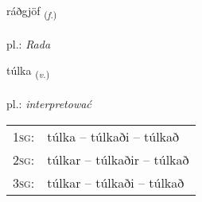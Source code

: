 \documentclass[frontgrid, backgrid]{flacards}\usepackage[]{graphicx}\usepackage[]{xcolor}
\begin{document}
\renewcommand{\blhead}{\vskip5pt {\small\bfseries\footnotesize Nafnorð | Noun }}
\renewcommand{\bcfoot}{\vskip5pt \hspace{2pt}{\small\bfseries\footnotesize 2K}}


{ráðgjöf \small{\textsubscript{(\textit{f.})}} \\[1ex] %
\textphonetic{[rauðcœv]} \\
pl.: \emph{Rada} \\  [2ex]
\renewcommand*{\arraystretch}{0.8}
}

\renewcommand{\flhead}{\vskip5pt \fboxsep=0pt {\small\bfseries\footnotesize Sagnorð | Verb}}
\renewcommand{\fcfoot}{\vskip5pt \fboxsep=0pt \hspace{2pt}{\small\bfseries\footnotesize 2K}}

\renewcommand{\blhead}{\vskip5pt {\small\bfseries\footnotesize Sagnorð | Verb }}
\renewcommand{\bcfoot}{\vskip5pt \hspace{2pt}{\small\bfseries\footnotesize 2K}}


{túlka \small{\textsubscript{(\textit{v.})}} \\[1ex] %
\textphonetic{[tʰul̥ka]} \\
pl.: \emph{interpretować} \\  [2ex]
\renewcommand*{\arraystretch}{0.8}
\begin{tabular}{p{1cm}l}
\textsc{1sg}: & túlka -- túlkaði -- túlkað \\ 
\textsc{2sg}: & túlkar -- túlkaðir -- túlkað \\ 
\textsc{3sg}: & túlkar -- túlkaði -- túlkað \\ 
\end{tabular}
}

\renewcommand{\flhead}{\vskip5pt \fboxsep=0pt {\small\bfseries\footnotesize Nafnorð | Noun}}
\renewcommand{\fcfoot}{\vskip5pt \fboxsep=0pt \hspace{2pt}{\small\bfseries\footnotesize 2K}}
\end{document}
